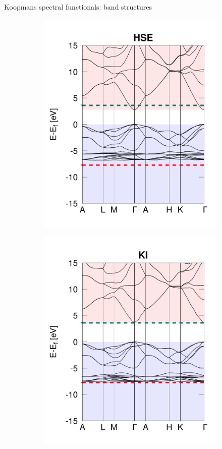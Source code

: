 \documentclass[xcolor=table,aspectratio=169]{beamer}
\numberwithin{equation}{section}
\begin{document}
\begin{frame}{\normalsize Koopmans spectral functionals: band structures}
\begin{figure}[t]
\begin{subfigure}{0.3\textwidth}
         \includegraphics[width=\columnwidth]{figures/ZnO_hse.png}
      \end{subfigure}
      \begin{subfigure}{0.3\textwidth}
         \includegraphics[width=\columnwidth]{figures/ZnO_ki.png}

\end{subfigure}
\end{figure}
\end{frame}
\end{document}
